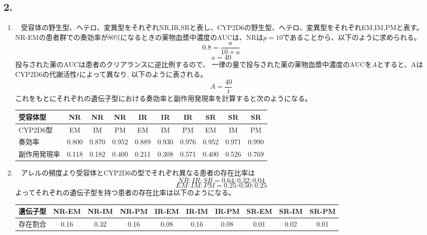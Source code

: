 \documentclass[a4paper,papersize,dvipdfmx]{jsarticle}
\newcommand{\mon}[1]{\item[({#1})] \ }
\begin{document}
\subsection*{2.}
\begin{enumerate}
\mon{1}
受容体の野生型、ヘテロ、変異型をそれぞれNR,IR,SRと表し、CYP2D6の野生型、ヘテロ、変異型をそれぞれEM,IM,PMと表す。
NR-EMの患者群での奏効率が80\%になるときの薬物血漿中濃度のAUCは、NRは$p=10$であることから、以下のように求められる。
\[
0.8 = \frac{a}{10+a}
\]\[
a = 40
\]
投与された薬のAUCは患者のクリアランスに逆比例するので、
一律の量で投与された薬の薬物血漿中濃度のAUCを$A$とすると、AはCYP2D6の代謝活性$t$によって異なり,
以下のように表される。
\[A = \frac{40}{t}\]
これをもとにそれぞれの遺伝子型における奏効率と副作用発現率を計算すると次のようになる。

\begin{table}[H]
\begin{center}
\begin{tabular}{|l|c|c|c|c|c|c|c|c|c|}
\hline
受容体型    & NR    & NR    & NR    & IR    & IR    & IR    & SR    & SR    & SR    \\ \hline
CYP2D6型 & EM    & IM    & PM    & EM    & IM    & PM    & EM    & IM    & PM    \\ \hline
奏効率     & 0.800 & 0.870 & 0.952 & 0.889 & 0.930 & 0.976 & 0.952 & 0.971 & 0.990 \\ \hline
副作用発現率  & 0.118 & 0.182 & 0.400 & 0.211 & 0.308 & 0.571 & 0.400 & 0.526 & 0.769 \\ \hline
\end{tabular}
\end{center}
\end{table}

\mon{2}
アレルの頻度より受容体とCYP2D6の型でそれぞれ異なる患者の存在比率は
\[NR : IR : SR = 0.64 : 0.32 : 0.04\]
\[EM : IM : PM = 0.25 : 0.50 : 0.25\]
よってそれぞれの遺伝子型を持つ患者の存在比率は以下のようになる。

\begin{table}[H]
\begin{center}
\begin{tabular}{|l|c|c|c|c|c|c|c|c|c|}
\hline
遺伝子型 & NR-EM & NR-IM & NR-PM & IR-EM & IR-IM & IR-PM & SR-EM & SR-IM & SR-PM \\ \hline
存在割合 & 0.16  & 0.32  & 0.16  & 0.08  & 0.16  & 0.08  & 0.01  & 0.02  & 0.01  \\ \hline
\end{tabular}
\end{center}
\end{table}


\end{enumerate}
\end{document}
